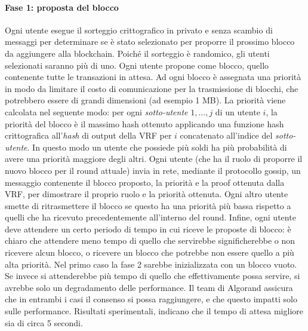 \paragraph*{Fase 1: proposta del blocco}
Ogni utente esegue il sorteggio crittografico in privato e senza scambio di messaggi per determinare se è stato selezionato per proporre il prossimo blocco da aggiungere alla blockchain. Poiché il sorteggio è randomico, gli utenti selezionati saranno più di uno. Ogni utente propone come blocco, quello contenente tutte le transazioni in attesa. Ad ogni blocco è assegnata una priorità in modo da limitare il costo di comunicazione per la trasmissione di blocchi, che potrebbero essere di grandi dimensioni (ad esempio 1 MB). La priorità viene calcolata nel seguente modo: per ogni \emph{sotto-utente} $1, ..., j$ di un utente $i$, la priorità del blocco è il massimo hash ottenuto applicando una funzione hash crittografica all'\emph{hash} di output della VRF per $i$ concatenato all'indice del \emph{sotto-utente}. In questo modo un utente che possiede più soldi ha più probabilità di avere una priorità maggiore degli altri. Ogni utente (che ha il ruolo di proporre il nuovo blocco per il round attuale) invia in rete, mediante il protocollo gossip, un messaggio contenente il blocco proposto, la priorità e la proof ottenuta dalla VRF, per dimostrare il proprio ruolo e la priorità ottenuta. Ogni altro utente smette di ritrasmettere il blocco se questo ha una priorità più bassa rispetto a quelli che ha ricevuto precedentemente all'interno del round. Infine, ogni utente deve attendere un certo periodo di tempo in cui riceve le proposte di blocco: è chiaro che attendere meno tempo di quello che servirebbe significherebbe o non ricevere alcun blocco, o ricevere un blocco che potrebbe non essere quello a più alta priorità. Nel primo caso la fase 2 sarebbe inizializzata con un blocco vuoto. Se invece si attenderebbe più tempo di quello che effettivamente possa servire, si avrebbe solo un degradamento delle performance. Il team di Algorand assicura che in entrambi i casi il consenso si possa raggiungere, e che questo impatti solo sulle performance. Risultati sperimentali, indicano che il tempo di attesa migliore sia di circa 5 secondi.

